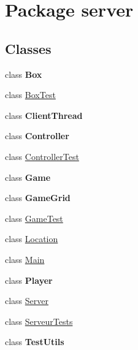 \hypertarget{namespaceserver}{}\section{Package server}
\label{namespaceserver}
\subsection*{Classes}
\begin{DoxyCompactItemize}
\item 
class {\bfseries Box}
\item 
class \hyperlink{classserver_1_1_box_test}{Box\+Test}
\item 
class {\bfseries Client\+Thread}
\item 
class {\bfseries Controller}
\item 
class \hyperlink{classserver_1_1_controller_test}{Controller\+Test}
\item 
class {\bfseries Game}
\item 
class {\bfseries Game\+Grid}
\item 
class \hyperlink{classserver_1_1_game_test}{Game\+Test}
\item 
class \hyperlink{classserver_1_1_location}{Location}
\item 
class \hyperlink{classserver_1_1_main}{Main}
\item 
class {\bfseries Player}
\item 
class \hyperlink{classserver_1_1_server}{Server}
\item 
class \hyperlink{classserver_1_1_serveur_tests}{Serveur\+Tests}
\item 
class {\bfseries Test\+Utils}
\end{DoxyCompactItemize}
